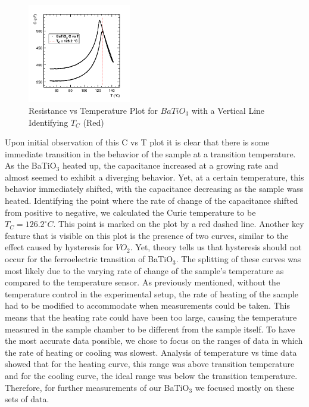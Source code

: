 \documentclass[%
 reprint,
 amsmath,amssymb,
 aps,
 pra,
]{revtex4-1}
\begin{document}
\begin{figure}[H]
	\centering
	\includegraphics[width=0.4\textwidth]{BaTiO3_CvT_withTC.png}
	\caption{Resistance vs Temperature Plot for $BaTiO_{3}$ with a Vertical Line Identifying $T_{C}$ (Red)}
	\label{Fig:CvT1}
\end{figure}

Upon initial observation of this C vs T plot it is clear that there is some immediate transition in the behavior of the sample at a transition temperature. As the BaTiO$_{3}$ heated up, the capacitance increased at a growing rate and almost seemed to exhibit a diverging behavior. Yet, at a certain temperature, this behavior immediately shifted, with the capacitance decreasing as the sample wass heated. Identifying the point where the rate of change of the capacitance shifted from positive to negative, we calculated the Curie temperature to be $T_{C} = 126.2^\circ C$. This point is marked on the plot by a red dashed line. Another key feature that is visible on this plot is the presence of two curves, similar to the effect caused by hysteresis for $VO_{2}$. Yet, theory tells us that hysteresis should not occur for the ferroelectric transition of BaTiO$_{3}$. The splitting of these curves was most likely due to the varying rate of change of the sample's temperature as compared to the temperature sensor. As previously mentioned, without the temperature control in the experimental setup, the rate of heating of the sample had to be modified to accommodate when measurements could be taken. This means that the heating rate could have been too large, causing the temperature measured in the sample chamber to be different from the sample itself. To have the most accurate data possible, we chose to focus on the ranges of data in which the rate of heating or cooling was slowest. Analysis of temperature vs time data showed that for the heating curve, this range was above transition temperature and for the cooling curve, the ideal range was below the transition temperature. Therefore, for further measurements of our BaTiO$_{3}$ we focused mostly on these sets of data.
\end{document}
